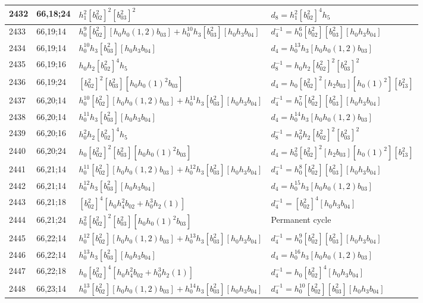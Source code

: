 \documentclass{article}
\begin{document}
\begin{longtable}{|l|l|>{\raggedright\arraybackslash}p{6cm}|>{\raggedright\arraybackslash}p{6cm}|}
\hline
2432 & 66,18;24 & $h_1^2[b_{02}^2]^2[b_{03}^2]^2$ &$d_{8}=h_1^2[b_{02}^2]^4h_5$\\
\hline
2433 & 66,19;14 & $h_0^9[b_{02}^2][h_0h_0(1, 2)b_{03}] + h_0^{10}h_3[b_{03}^2][h_0h_3b_{04}]$ & $d_{4}^{-1}=h_0^6[b_{02}^2][b_{03}^2][h_0h_3b_{04}]$\\
2434 & 66,19;14 & $h_0^{10}h_3[b_{03}^2][h_0h_3b_{04}]$ &$d_{4}=h_0^{13}h_3[h_0h_0(1, 2)b_{03}]$\\
\hline
2435 & 66,19;16 & $h_0h_2[b_{02}^2]^4h_5$ & $d_{8}^{-1}=h_0h_2[b_{02}^2]^2[b_{03}^2]^2$\\
\hline
2436 & 66,19;24 & $[b_{02}^2]^2[b_{03}^2][h_0h_0(1)^2b_{03}]$ &$d_{4}=h_0[b_{02}^2]^2[h_2b_{03}][h_0(1)^2][b_{13}^2]$\\
\hline
2437 & 66,20;14 & $h_0^{10}[b_{02}^2][h_0h_0(1, 2)b_{03}] + h_0^{11}h_3[b_{03}^2][h_0h_3b_{04}]$ & $d_{4}^{-1}=h_0^7[b_{02}^2][b_{03}^2][h_0h_3b_{04}]$\\
2438 & 66,20;14 & $h_0^{11}h_3[b_{03}^2][h_0h_3b_{04}]$ &$d_{4}=h_0^{14}h_3[h_0h_0(1, 2)b_{03}]$\\
\hline
2439 & 66,20;16 & $h_0^2h_2[b_{02}^2]^4h_5$ & $d_{8}^{-1}=h_0^2h_2[b_{02}^2]^2[b_{03}^2]^2$\\
\hline
2440 & 66,20;24 & $h_0[b_{02}^2]^2[b_{03}^2][h_0h_0(1)^2b_{03}]$ &$d_{4}=h_0^2[b_{02}^2]^2[h_2b_{03}][h_0(1)^2][b_{13}^2]$\\
\hline
2441 & 66,21;14 & $h_0^{11}[b_{02}^2][h_0h_0(1, 2)b_{03}] + h_0^{12}h_3[b_{03}^2][h_0h_3b_{04}]$ & $d_{4}^{-1}=h_0^8[b_{02}^2][b_{03}^2][h_0h_3b_{04}]$\\
2442 & 66,21;14 & $h_0^{12}h_3[b_{03}^2][h_0h_3b_{04}]$ &$d_{4}=h_0^{15}h_3[h_0h_0(1, 2)b_{03}]$\\
\hline
2443 & 66,21;18 & $[b_{02}^2]^4[h_0h_4^2b_{02} + h_0^3h_2(1)]$ & $d_{4}^{-1}=[b_{02}^2]^4[h_0h_3b_{04}]$\\
\hline
2444 & 66,21;24 & $h_0^2[b_{02}^2]^2[b_{03}^2][h_0h_0(1)^2b_{03}]$ & Permanent cycle\\
\hline
2445 & 66,22;14 & $h_0^{12}[b_{02}^2][h_0h_0(1, 2)b_{03}] + h_0^{13}h_3[b_{03}^2][h_0h_3b_{04}]$ & $d_{4}^{-1}=h_0^9[b_{02}^2][b_{03}^2][h_0h_3b_{04}]$\\
2446 & 66,22;14 & $h_0^{13}h_3[b_{03}^2][h_0h_3b_{04}]$ &$d_{4}=h_0^{16}h_3[h_0h_0(1, 2)b_{03}]$\\
\hline
2447 & 66,22;18 & $h_0[b_{02}^2]^4[h_0h_4^2b_{02} + h_0^3h_2(1)]$ & $d_{4}^{-1}=h_0[b_{02}^2]^4[h_0h_3b_{04}]$\\
\hline
2448 & 66,23;14 & $h_0^{13}[b_{02}^2][h_0h_0(1, 2)b_{03}] + h_0^{14}h_3[b_{03}^2][h_0h_3b_{04}]$ & $d_{4}^{-1}=h_0^{10}[b_{02}^2][b_{03}^2][h_0h_3b_{04}]$\\

\end{longtable}
\end{document}
